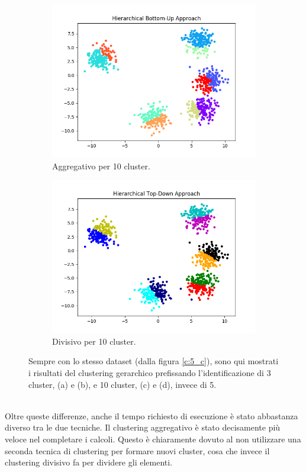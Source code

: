 \documentclass{llncs}
\begin{document}
\begin{figure}[h]
\begin{subfigure}{.5\textwidth}
			\includegraphics[width=\linewidth]{immagini/5_clusters_agg_10.png}
			\caption{Aggregativo per 10 cluster.}
			\label{hier:c}			
		  \end{subfigure}
		  \begin{subfigure}{.5\textwidth}
			\centering
			\includegraphics[width=\linewidth]{immagini/5_clusters_div_10.png}
			\caption{Divisivo per 10 cluster.}
			\label{hier:d}			
		  \end{subfigure}
		\caption{Sempre con lo stesso dataset (dalla figura \ref{c:5_c}), sono qui mostrati i risultati del clustering gerarchico prefissando
		l'identificazione di 3 cluster, (a) e (b), e 10 cluster, (c) e (d), invece di 5.}
		\label{hier:test}
	\end{figure}\\
	Oltre queste differenze, anche il tempo richiesto di esecuzione è stato abbastanza diverso tra le due tecniche. Il clustering aggregativo è stato
	decisamente più veloce nel completare i calcoli. Questo è chiaramente dovuto al non utilizzare una seconda tecnica di clustering per formare nuovi cluster, 
	cosa che invece il clustering divisivo fa per dividere gli elementi.
\end{document}
